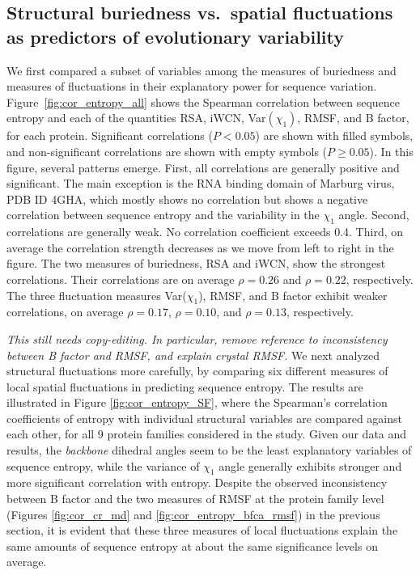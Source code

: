\documentclass[12pt]{article}
\begin{document}
\subsection*{Structural buriedness vs.\ spatial fluctuations as predictors of evolutionary variability}

We first compared a subset of variables among the measures of buriedness and measures of fluctuations in their explanatory power for sequence variation. Figure~\ref{fig:cor_entropy_all} shows the Spearman correlation between sequence entropy and each of the quantities RSA, iWCN, Var$(\chi_1)$, RMSF, and B factor, for each protein. Significant correlations ($P<0.05$) are shown with filled symbols, and non-significant correlations are shown with empty symbols ($P\geq0.05$).
In this figure, several patterns emerge. First, all correlations are generally positive and significant. The main exception is the RNA binding domain of Marburg virus, PDB ID 4GHA, which mostly shows no correlation but shows a negative correlation between sequence entropy and the variability in the $\chi_1$ angle. Second, correlations are generally weak. No correlation coefficient exceeds 0.4. Third, on average the correlation strength decreases as we move from left to right in the figure. The two measures of buriedness, RSA and iWCN, show the strongest correlations. Their correlations are on average $\rho=0.26$ and $\rho=0.22$, respectively. The three fluctuation measures Var($\chi_1$), RMSF, and B factor exhibit weaker correlations, on average $\rho=0.17$, $\rho=0.10$, and $\rho=0.13$, respectively.

{\color{blue}\emph{This still needs copy-editing. In particular, remove reference to inconsistency between B factor and RMSF, and explain crystal RMSF.}
We next analyzed structural fluctuations more carefully, by comparing six different measures of local spatial fluctuations in predicting sequence entropy. The results are illustrated in Figure \ref{fig:cor_entropy_SF}, where the Spearman's correlation coefficients of entropy with individual structural variables are compared against each other, for all 9 protein families considered in the study. Given our data and results, the {\it backbone} dihedral angles seem to be the least explanatory variables of sequence entropy, while the variance of $\chi_1$ angle generally exhibits stronger and more significant correlation with entropy. Despite the observed inconsistency between B factor and the two measures of RMSF at the protein family level (Figures \ref{fig:cor_cr_md} and \ref{fig:cor_entropy_bfca_rmsf}) in the previous section, it is evident that these three measures of local fluctuations explain the same amounts of sequence entropy at about the same significance levels on average.
}
\end{document}
